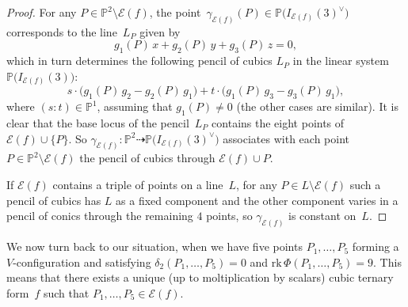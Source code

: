 \documentclass{amsart}
\theoremstyle{plain}
\theoremstyle{definition}
\newcommand{\p}{\mathbb{P}}
\newcommand{\Eig}[1]{\mathcal{E}\!\left( {#1} \right)}
\newcommand{\rk}{\ensuremath{\mathrm{rk}}}
\begin{document}
\begin{proof}
%
For any $P \in \p^2 \setminus \Eig{f}$, the point~$\gamma_{\Eig{f}} (P)\in \p \bigl(I_{\Eig{f}}(3)^{\vee}\bigr)$ corresponds to the line~$L_P$ given by
\[
  g_1 (P) \, x + g_2(P) \, y + g_3(P) \, z = 0,
\]
%
which in turn determines the following
pencil of cubics $L_P$ in the linear system $\p \bigl(I_{\Eig{f}}(3)\bigr)$:
%
\[
  s \cdot \bigl( g_1(P) \, g_2 - g_2(P) \, g_1 \bigr) + t \cdot \bigl( g_1(P) \, g_3 - g_3(P) \, g_1 \bigr),
\]
%
where $(s: t) \in \p^1$, assuming that $g_1(P) \neq 0$ (the other cases are similar).
It is clear that the base locus of the pencil~$L_P$ contains the eight points of~$\Eig{f} \cup \{P\}$.
So $\gamma_{\Eig{f}} \colon \p^2 \dasharrow \p \bigl( I_{\Eig{f}}(3)^\vee \bigr)$
associates with each point $P \in \p^2 \setminus \Eig{f}$ the pencil of cubics through $\Eig{f} \cup P$.

If $\Eig{f}$ contains a triple of points on a line~$L$, for any $P \in L \setminus \Eig{f}$ such a pencil of cubics has $L$ as a fixed component and the other component varies in a pencil of conics through the remaining $4$ points, so $\gamma_{\Eig{f}}$ is constant on~$L$.
\end{proof}



We now turn back to our situation, when we have five points $P_1, \dots, P_5$ forming a $V$-configuration and satisfying $\delta_2(P_1, \dots, P_5)=0$ and $\rk \, \Phi(P_1, \dotsc, P_5) = 9$. This means that there exists a unique (up to moltiplication by scalars) cubic ternary form~$f$ such that $P_1, \dotsc, P_5 \in \Eig{f}$.
\end{document}
